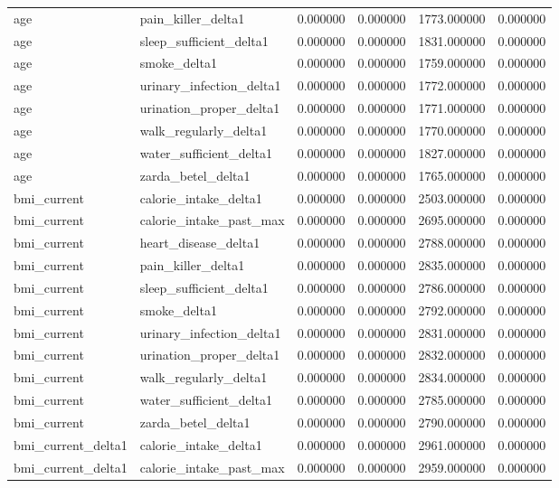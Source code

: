 \begin{longtable}{llrrrr}
age & pain\_killer\_delta1 & 0.000000 & 0.000000 & 1773.000000 & 0.000000 \\
age & sleep\_sufficient\_delta1 & 0.000000 & 0.000000 & 1831.000000 & 0.000000 \\
age & smoke\_delta1 & 0.000000 & 0.000000 & 1759.000000 & 0.000000 \\
age & urinary\_infection\_delta1 & 0.000000 & 0.000000 & 1772.000000 & 0.000000 \\
age & urination\_proper\_delta1 & 0.000000 & 0.000000 & 1771.000000 & 0.000000 \\
age & walk\_regularly\_delta1 & 0.000000 & 0.000000 & 1770.000000 & 0.000000 \\
age & water\_sufficient\_delta1 & 0.000000 & 0.000000 & 1827.000000 & 0.000000 \\
age & zarda\_betel\_delta1 & 0.000000 & 0.000000 & 1765.000000 & 0.000000 \\
bmi\_current & calorie\_intake\_delta1 & 0.000000 & 0.000000 & 2503.000000 & 0.000000 \\
bmi\_current & calorie\_intake\_past\_max & 0.000000 & 0.000000 & 2695.000000 & 0.000000 \\
bmi\_current & heart\_disease\_delta1 & 0.000000 & 0.000000 & 2788.000000 & 0.000000 \\
bmi\_current & pain\_killer\_delta1 & 0.000000 & 0.000000 & 2835.000000 & 0.000000 \\
bmi\_current & sleep\_sufficient\_delta1 & 0.000000 & 0.000000 & 2786.000000 & 0.000000 \\
bmi\_current & smoke\_delta1 & 0.000000 & 0.000000 & 2792.000000 & 0.000000 \\
bmi\_current & urinary\_infection\_delta1 & 0.000000 & 0.000000 & 2831.000000 & 0.000000 \\
bmi\_current & urination\_proper\_delta1 & 0.000000 & 0.000000 & 2832.000000 & 0.000000 \\
bmi\_current & walk\_regularly\_delta1 & 0.000000 & 0.000000 & 2834.000000 & 0.000000 \\
bmi\_current & water\_sufficient\_delta1 & 0.000000 & 0.000000 & 2785.000000 & 0.000000 \\
bmi\_current & zarda\_betel\_delta1 & 0.000000 & 0.000000 & 2790.000000 & 0.000000 \\
bmi\_current\_delta1 & calorie\_intake\_delta1 & 0.000000 & 0.000000 & 2961.000000 & 0.000000 \\
bmi\_current\_delta1 & calorie\_intake\_past\_max & 0.000000 & 0.000000 & 2959.000000 & 0.000000 \\

\end{longtable}
